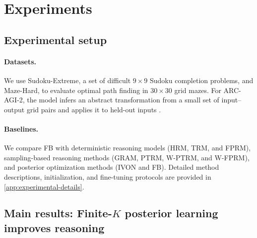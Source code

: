\section{Experiments}
\label{sec:experiments}

\subsection{Experimental setup}
\label{sec:experimental-setup}

\paragraph{Datasets.}
We use Sudoku-Extreme, a set of difficult $9\times9$ Sudoku completion problems, and Maze-Hard, to evaluate optimal path finding in $30\times30$ grid mazes.
For ARC-AGI-2, the model infers an abstract transformation from a small set of input--output grid pairs and applies it to held-out inputs \citep{chollet2025arcagi2}.

\paragraph{Baselines.}
We compare FB with deterministic reasoning models (HRM, TRM, and FPRM), sampling-based reasoning methods (GRAM, PTRM, W-PTRM, and W-FPRM), and posterior optimization methods (IVON and FB). Detailed method descriptions, initialization, and fine-tuning protocols are provided in \cref{app:experimental-details}.

\subsection{Main results: Finite-$K$ posterior learning improves reasoning}
\label{sec:main-results}

